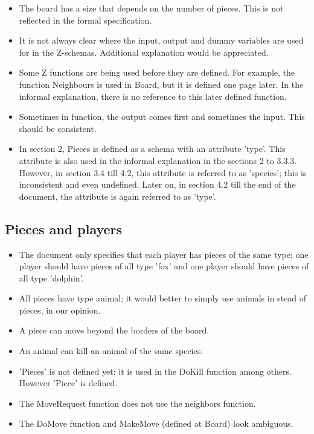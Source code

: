 \documentclass[a4paper,11pt]{article}
\begin{document}
\begin{itemize}
        \item The board has a size that depends on the number of pieces. This is not reflected in the formal specification.
        \item It is not always clear where the input, output and dummy variables are used for in the Z-schemas. Additional explanation would be appreciated.
	   \item Some Z functions are being used before they are defined. For example, the function Neighbours is used in Board, but it is defined one page later. In the informal explanation, there is no reference to this later defined function.
        \item Sometimes in function, the output comes first and sometimes the input. This should be consistent.
        \item In section 2, Pieces is defined as a schema with an attribute 'type'. This attribute is also used in the informal explanation in the sections 2 to 3.3.3. However, in section 3.4 till 4.2, this attribute is referred to as 'species'; this is inconsistent and even undefined. Later on, in section 4.2 till the end of the document, the attribute is again referred to as 'type'.
   \end{itemize}

    \subsection{Pieces and players}
    \begin{itemize}
        \item The document only specifies that each player has pieces of the same type; one player should have pieces of all type 'fox' and one player should have pieces of all type 'dolphin'.
        \item All pieces have type animal; it would better to simply use animals in stead of pieces, in our opinion.
        \item A piece can move beyond the borders of the board.
        \item An animal can kill an animal of the same species.
        \item 'Pieces' is not defined yet; it is used in the DoKill function among others. However 'Piece' is defined.
        \item The MoveRequest function does not use the neighbors function.
        \item The DoMove function and MakeMove (defined at Board) look ambiguous.
    \end{itemize}
\end{document}
